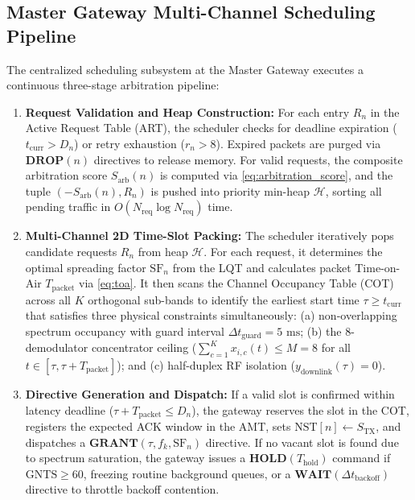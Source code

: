 \documentclass[preprint,review,12pt]{elsarticle}
\begin{document}
\subsection{Master Gateway Multi-Channel Scheduling Pipeline}
\label{sec:master_pipeline}
The centralized scheduling subsystem at the Master Gateway executes a continuous three-stage arbitration pipeline:
\begin{enumerate}
    \item \textbf{Request Validation and Heap Construction:} For each entry $R_n$ in the Active Request Table (ART), the scheduler checks for deadline expiration ($t_{\text{curr}} > D_n$) or retry exhaustion ($r_n > 8$). Expired packets are purged via $\textbf{DROP}(n)$ directives to release memory. For valid requests, the composite arbitration score $S_{\text{arb}}(n)$ is computed via \eqref{eq:arbitration_score}, and the tuple $(-S_{\text{arb}}(n), R_n)$ is pushed into priority min-heap $\mathcal{H}$, sorting all pending traffic in $O(N_{\text{req}} \log N_{\text{req}})$ time.
    \item \textbf{Multi-Channel 2D Time-Slot Packing:} The scheduler iteratively pops candidate requests $R_n$ from heap $\mathcal{H}$. For each request, it determines the optimal spreading factor $\text{SF}_n$ from the LQT and calculates packet Time-on-Air $T_{\text{packet}}$ via \eqref{eq:toa}. It then scans the Channel Occupancy Table (COT) across all $K$ orthogonal sub-bands to identify the earliest start time $\tau \ge t_{\text{curr}}$ that satisfies three physical constraints simultaneously: (a) non-overlapping spectrum occupancy with guard interval $\Delta t_{\text{guard}} = 5\text{ ms}$; (b) the 8-demodulator concentrator ceiling ($\sum_{c=1}^K x_{i,c}(t) \le M = 8$ for all $t \in [\tau, \tau + T_{\text{packet}}]$); and (c) half-duplex RF isolation ($y_{\text{downlink}}(\tau) = 0$).
    \item \textbf{Directive Generation and Dispatch:} If a valid slot is confirmed within latency deadline ($\tau + T_{\text{packet}} \le D_n$), the gateway reserves the slot in the COT, registers the expected ACK window in the AMT, sets $\text{NST}[n] \leftarrow S_{\text{TX}}$, and dispatches a $\textbf{GRANT}(\tau, f_k, \text{SF}_n)$ directive. If no vacant slot is found due to spectrum saturation, the gateway issues a $\textbf{HOLD}(T_{\text{hold}})$ command if $\text{GNTS} \ge 60$, freezing routine background queues, or a $\textbf{WAIT}(\Delta t_{\text{backoff}})$ directive to throttle backoff contention.
\end{enumerate}
\end{document}
